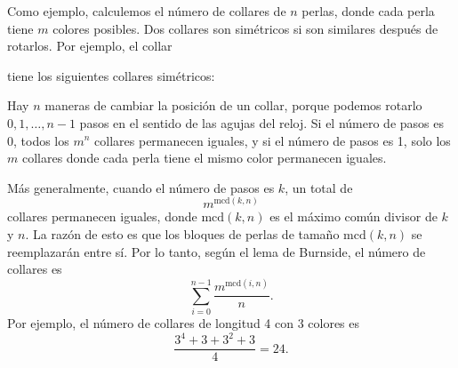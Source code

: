 Como ejemplo, calculemos el número de
collares de $n$ perlas,
donde cada perla tiene $m$ colores posibles.
Dos collares son simétricos si son
similares después de rotarlos.
Por ejemplo, el collar
\begin{center}
\end{center}
tiene los siguientes collares simétricos:
\begin{center}
\end{center}
Hay $n$ maneras de cambiar la posición
de un collar,
porque podemos rotarlo
$0,1,\ldots,n-1$ pasos en el sentido de las agujas del reloj.
Si el número de pasos es 0,
todos los $m^n$ collares permanecen iguales,
y si el número de pasos es 1,
solo los $m$ collares donde cada
perla tiene el mismo color permanecen iguales.

Más generalmente, cuando el número de pasos es $k$,
un total de
\[m^{\textrm{mcd}(k,n)}\]
collares permanecen iguales,
donde $\textrm{mcd}(k,n)$ es el máximo común
divisor de $k$ y $n$.
La razón de esto es que los bloques
de perlas de tamaño $\textrm{mcd}(k,n)$
se reemplazarán entre sí.
Por lo tanto, según el lema de Burnside,
el número de collares es
\[\sum_{i=0}^{n-1} \frac{m^{\textrm{mcd}(i,n)}}{n}. \]
Por ejemplo, el número de collares de longitud 4
con 3 colores es
\[\frac{3^4+3+3^2+3}{4} = 24. \]


